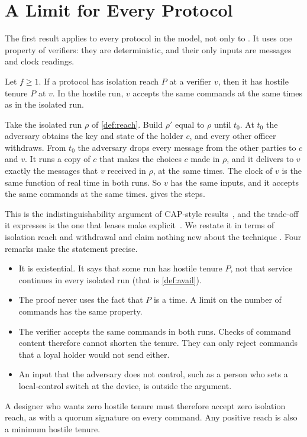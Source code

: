 \section{A Limit for Every Protocol}
\label{sec:limit}

The first result applies to every protocol in the model, not only to \sys{}. It uses one
property of verifiers: they are deterministic, and their only inputs are messages and
clock readings.

\begin{prp}
\label{prp:limit}
Let $f \ge 1$. If a protocol has isolation reach $P$ at a verifier $v$, then it has hostile
tenure $P$ at $v$. In the hostile run, $v$ accepts the same commands at the same times as
in the isolated run.
\end{prp}

\begin{argument}
Take the isolated run $\rho$ of \cref{def:reach}. Build $\rho'$ equal to $\rho$ until
$t_0$. At $t_0$ the adversary obtains the key and state of the holder $c$, and every other
officer withdraws. From $t_0$ the adversary drops every message from the other parties to
$c$ and $v$. It runs a copy of $c$ that makes the choices $c$ made in $\rho$, and it
delivers to $v$ exactly the messages that $v$ received in $\rho$, at the same times. The
clock of $v$ is the same function of real time in both runs. So $v$ has the same inputs,
and it accepts the same commands at the same times.  gives the steps.
\end{argument}

This is the indistinguishability argument of CAP-style
results~\cite{gilbert2002cap}, and the trade-off it expresses is the one that leases
make explicit~\cite{gray1989leases}. We restate it in terms of isolation reach and
withdrawal and claim nothing new about the technique . Four remarks make the
statement precise.
\begin{itemize}
  \item It is existential. It says that some run has hostile tenure $P$, not that service
  continues in every isolated run (that is \cref{def:avail}).
  \item The proof never uses the fact that $P$ is a time. A limit on the number of
  commands has the same property.
  \item The verifier accepts the same commands in both runs. Checks of command content
  therefore cannot shorten the tenure. They can only reject commands that a loyal holder
  would not send either.
  \item An input that the adversary does not control, such as a person who sets a
  local-control switch at the device, is outside the argument.
\end{itemize}
A designer who wants zero hostile tenure must therefore accept zero isolation reach, as
with a quorum signature on every command. Any positive reach is also a minimum hostile
tenure.
